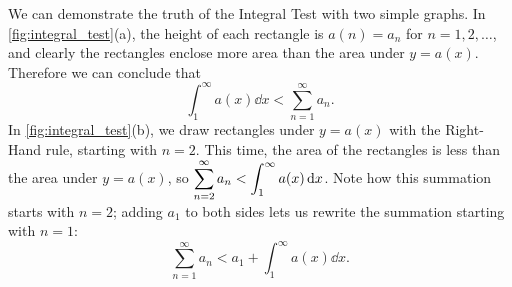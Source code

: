 We can demonstrate the truth of the Integral Test with two simple graphs. In \autoref{fig:integral_test}(a), the height of each rectangle is $a(n)=a_n$ for $n=1,2,\dotsc$, and clearly the rectangles enclose more area than the area under $y=a(x)$. Therefore we can conclude that
\begin{equation}
\int_1^\infty a(x)\dd x < \sum_{n=1}^\infty a_n.\label{eq:integral_testa}
\end{equation}
In \autoref{fig:integral_test}(b), we draw rectangles under $y=a(x)$ with the Right-Hand rule, starting with $n=2$. This time, the area of the rectangles is less than the area under $y=a(x)$, so $\displaystyle\sum_{n=2}^\infty a_n < \int_1^\infty a(x)\operatorname{d}\! x$. Note how this summation starts with $n=2$; adding $a_1$ to both sides lets us rewrite the summation starting with $n=1$:
\begin{equation}
\sum_{n=1}^\infty a_n < a_1 +\int_1^\infty a(x)\dd x.\label{eq:integral_testb}
\end{equation} 

